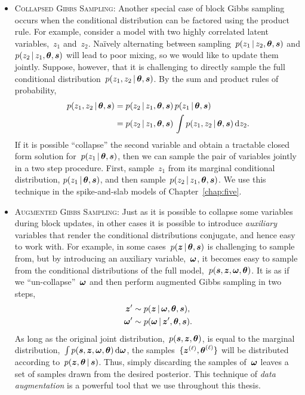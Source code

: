 \begin{itemize}
\item \textsc{Collapsed Gibbs Sampling}: Another special case of block
  Gibbs sampling occurs when the conditional distribution can be
  factored using the product rule. For example, consider a model with
  two highly correlated latent variables,~$z_1$ and~$z_2$.  Na\"ively
  alternating between sampling~${p(z_1 \,|\, z_2, \boldsymbol{\theta}, \boldsymbol{s})}$ and
  ${p(z_2 \,|\, z_1, \boldsymbol{\theta}, \boldsymbol{s})}$ will lead to poor mixing, so we
  would like to update them jointly.  Suppose, however, that it is
  challenging to directly sample the full conditional
  distribution~$p(z_1, z_2 \,|\, \boldsymbol{\theta}, \boldsymbol{s})$. By the sum and product rules
  of probability,
  \begin{align*}
    p(z_1, z_2 \,|\, \boldsymbol{\theta}, \boldsymbol{s}) 
    &= p(z_2 \,|\, z_1, \boldsymbol{\theta}, \boldsymbol{s}) \, 
      p(z_1 \,|\, \boldsymbol{\theta}, \boldsymbol{s}) \\
    &= p(z_2 \,|\, z_1, \boldsymbol{\theta}, \boldsymbol{s}) \, 
      \int p(z_1, z_2 \,|\, \boldsymbol{\theta}, \boldsymbol{s}) \, \mathrm{d}z_2.
  \end{align*}
  If it is possible ``collapse'' the second variable and obtain a
  tractable closed form solution for~$p(z_1 \,|\, \boldsymbol{\theta}, \boldsymbol{s})$,
  then we can sample the pair of variables jointly in a two step
  procedure. First, sample~$z_1$ from its marginal conditional
  distribution, $p(z_1 \,|\, \boldsymbol{\theta}, \boldsymbol{s})$, and then
  sample~${p(z_2 \,|\, z_1, \boldsymbol{\theta}, \boldsymbol{s})}$. We use this technique 
  in the spike-and-slab models of Chapter~\ref{chap:five}.
  
\item \textsc{Augmented Gibbs Sampling}: Just as it is possible to
  collapse some variables during block updates, in other cases it is
  possible to introduce \emph{auxiliary} variables that render the
  conditional distributions conjugate, and hence easy to work
  with. For example, in some cases~$p(\boldsymbol{z} \,|\, \boldsymbol{\theta}, \boldsymbol{s})$ is
  challenging to sample from, but by introducing an auxiliary
  variable,~$\boldsymbol{\omega}$, it becomes easy to sample from the conditional
  distributions of the full model,~$p(\boldsymbol{s}, \boldsymbol{z}, \boldsymbol{\omega}, \boldsymbol{\theta})$.
  It is as if we ``un-collapse''~$\boldsymbol{\omega}$
  and then perform augmented Gibbs sampling in two steps,
  \begin{align*}
    \boldsymbol{z}' &\sim p(\boldsymbol{z} \,|\, \boldsymbol{\omega}, \boldsymbol{\theta}, \boldsymbol{s}), \\
    \boldsymbol{\omega}' &\sim p(\boldsymbol{\omega} \,|\, \boldsymbol{z}', \boldsymbol{\theta}, \boldsymbol{s}).
  \end{align*}
  As long as the original joint distribution,~$p(\boldsymbol{s}, \boldsymbol{z}, \boldsymbol{\theta})$,
  is equal to the marginal distribution,~${\int p(\boldsymbol{s}, \boldsymbol{z}, \boldsymbol{\omega},
    \boldsymbol{\theta}) \, \mathrm{d}\boldsymbol{\omega}}$, the samples~${\{\boldsymbol{z}^{(\ell)},
    \boldsymbol{\theta}^{(\ell)}\}}$ will be distributed according to~$p(\boldsymbol{z},
  \boldsymbol{\theta} \,|\, \boldsymbol{s})$.  Thus, simply discarding the samples
  of~$\boldsymbol{\omega}$ leaves a set of samples drawn from the desired
  posterior.  This technique of \emph{data augmentation} is a powerful
  tool that we use throughout this thesis.
\end{itemize}


